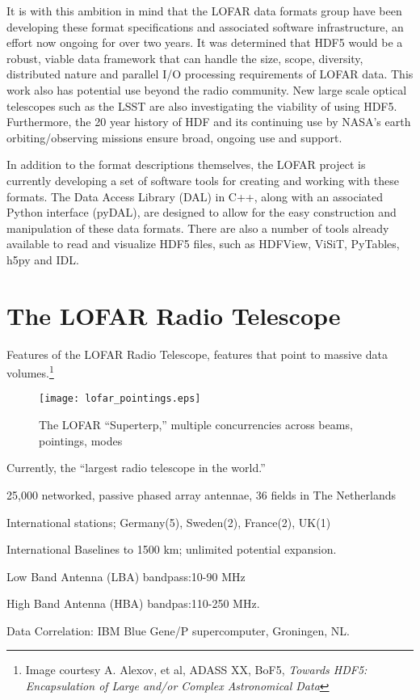 \documentclass[11pt,twoside]{article}
\begin{document}
It is with this ambition in mind that the LOFAR data formats group have been developing these format
specifications and associated software infrastructure, an effort now ongoing for over two years.
It was determined that  HDF5 would be a robust, viable data framework that can handle the size, scope,
diversity, distributed nature and parallel I/O processing requirements of LOFAR data.
This work also has potential use beyond the radio community. New large scale optical telescopes
such as the LSST are also investigating the viability of using HDF5. Furthermore, the 20 year history
of HDF and its continuing use by NASA's earth orbiting/observing missions ensure broad, ongoing use
and support.

In addition to the format descriptions themselves, the LOFAR project is currently developing a set of
software tools for creating and working with these formats. The Data Access Library (DAL) in C++,
along with an associated Python interface (pyDAL), are designed to allow for the easy construction
and manipulation of these data formats. There are also a number of tools already available to read
and visualize HDF5 files, such as HDFView, ViSiT, PyTables, h5py and IDL.
\section{The LOFAR Radio Telescope}
Features of the LOFAR Radio Telescope, features that point to massive data volumes.\footnote{Image courtesy A. Alexov, et al, ADASS XX, BoF5,
\textit{Towards HDF5: Encapsulation of Large and/or Complex Astronomical Data}}
\begin{figure}[htbp]
  \centering
  \texttt{[image: lofar\_pointings.eps]}
  \caption{The LOFAR ``Superterp,'' multiple concurrencies across beams, pointings, modes}
  \label{fig:lofarpoint}
\end{figure}
\begin{itemize}{\small
\item Currently, the “largest radio telescope in the world.”
\item 25,000 networked, passive phased array antennae, 36 fields in The Netherlands
\item International stations; Germany(5), Sweden(2), France(2), UK(1)
\item International Baselines to 1500 km; unlimited potential expansion.
\item Low Band Antenna (LBA) bandpass:10-90 MHz
\item High Band Antenna (HBA) bandpas:110-250 MHz.
\item Data Correlation: IBM Blue Gene/P supercomputer, Groningen, NL.
}
\end{itemize}
\end{document}
